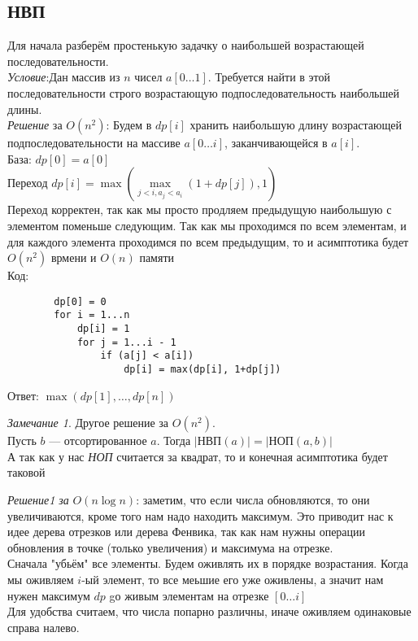\documentclass[a4paper, 12pt]{article}
\theoremstyle{plain}
\theoremstyle{definition}
\theoremstyle{remark}
\newtheorem*{remark}{Замечание}
\begin{document}
	\subsection{НВП}
	Для начала разберём простенькую задачку о наибольшей возрастающей последовательности.\\
	\textit{Условие}:Дан массив из $n$ чисел $a[0\dots1]$. Требуется найти в этой последовательности строго возрастающую подпоследовательность наибольшей длины.\\
	\textit{Решение} за $O(n^2)$: Будем в $dp[i]$ хранить наибольшую длину возрастающей подпоследовательности на массиве $a[0\dots i]$, заканчивающейся в $a[i]$. \\
	База: $dp[0]=a[0]$\\
	Переход $dp[i] =\max( \max\limits_{j<i, a_j<a_i}(1+dp[j]),1)$\\
	Переход корректен, так как мы просто продляем предыдущую наибольшую с элементом поменьше следующим. Так как мы проходимся по всем элементам, и для каждого элемента проходимся по всем предыдущим, то и асимптотика будет $O(n^2)$ врмени и $O(n)$ памяти\\
	Код:
	\begin{verbatim}
		dp[0] = 0
		for i = 1...n
		    dp[i] = 1
		    for j = 1...i - 1
		        if (a[j] < a[i])
		            dp[i] = max(dp[i], 1+dp[j])
	\end{verbatim}
Ответ: $\max(dp[1],\dots,dp[n])$\\
\begin{remark}
	Другое решение за $O(n^2)$.\\
	Пусть $b$ --- отсортированное $a$. Тогда $|\text{НВП}(a)|=|\text{НОП}(a,b)|$\\
	А так как у нас \textit{НОП} считается за квадрат, то и конечная асимптотика будет таковой
\end{remark}
\textit{Решение1 за} $O(n\log n)$:  заметим, что если числа обновляются, то они увеличиваются, кроме того нам надо находить максимум. Это приводит нас к идее дерева отрезков или дерева Фенвика, так как нам нужны операции обновления в точке (только увеличения) и максимума на отрезке.\\
Сначала "убьём" все элементы. Будем оживлять их в порядке возрастания. Когда мы оживляем $i$-ый элемент, то все меьшие его уже оживлены, а значит нам нужен максимум $dp$ gо живым элементам на отрезке $[0\dots i]$\\
Для удобства считаем, что числа попарно различны, иначе оживляем одинаковые справа налево.\\
\end{document}
